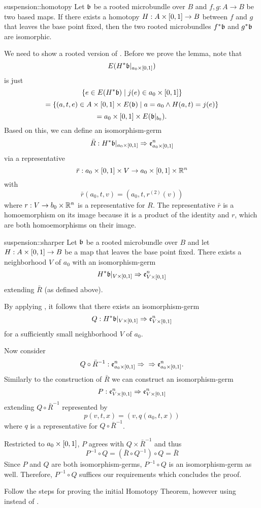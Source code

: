 \begin{mytheorem}{suspension::homotopy}
    Let $\mathfrak{b}$ be a rooted microbundle over $B$ and $f, g: A \to B$ be two based maps.
    If there exists a homotopy $H: A \times [0, 1] \to B$ between $f$ and $g$ that leaves the base point fixed,
    then the two rooted microbundles $f^*\mathfrak{b}$ and $g^*\mathfrak{b}$ are isomorphic.
\end{mytheorem}

\begin{myparagraph}
    We need to show a rooted version of .
    Before we prove the lemma, note that 
    \[ E(H^*\mathfrak{b}\vert_{a_0 \times [0, 1]}) \]
    is just
    \[ \{ e \in E(H^*\mathfrak{b}) \mid j(e) \in a_0 \times [0, 1] \} \]
    \[ = \{ (a, t, e) \in A \times [0, 1] \times E(\mathfrak{b}) \mid a = a_0 \land H(a, t) = j(e) \} \]
    \[ = a_0 \times [0, 1] \times E(\mathfrak{b}\vert_{b_0}). \]
    Based on this, we can define an isomorphism-germ
    \[ \bar{R}: H^*\mathfrak{b}\vert_{a_0 \times [0, 1]} \Rightarrow{}{} \mathfrak{e}^{n}_{a_0 \times [0, 1]} \]
    via a representative
    \[ \bar{r}: a_0 \times [0, 1] \times V \to a_0 \times [0, 1] \times \mathbb{R}^n \]
    with
    \[ \bar{r}(a_0, t, v) = (a_0, t, r^{(2)}(v) )\]
    where $r: V \to b_0 \times \mathbb{R}^n$ is a representative for $R$.
    The representative $\bar{r}$ is a homoemorphism on its image
    because it is a product of the identity and $r$, which are both homoemorphisms on their image. 
\end{myparagraph}

\begin{mylemma}{suspension::sharper}
    Let $\mathfrak{b}$ be a rooted microbundle over $B$ and let $H: A \times [0, 1] \to B$ be a map that leaves the base point fixed.
    There exists a neighborhood $V$ of $a_0$ with an isomorphism-germ
    \[ H^*\mathfrak{b}\vert_{V \times [0, 1]} \Rightarrow{}{} \mathfrak{e}^{n}_{V \times [0, 1]} \]
    extending $\bar{R}$ (as defined above).
\end{mylemma}
\begin{myproof}
    By applying , it follows that there exists an isomorphism-germ
    \[ Q: H^*\mathfrak{b}\vert_{V \times [0, 1]} \Rightarrow{}{} \mathfrak{e}^{n}_{V \times [0, 1]} \]
    for a sufficiently small neighborhood $V$ of $a_0$.

    Now consider
    \[ Q \circ \bar{R}^{-1}: \mathfrak{e}^{n}_{a_0 \times [0, 1]} \Rightarrow{}{} \Rightarrow{} \mathfrak{e}^{n}_{a_0 \times [0, 1]}. \]
    Similarly to the construction of $\bar{R}$ we can construct an isomorphism-germ
    \[ P: \mathfrak{e}^{n}_{V \times [0, 1]} \Rightarrow{}{} \mathfrak{e}^{n}_{V \times [0, 1]} \]
    extending $Q \circ \bar{R}^{-1}$ represented by
    \[ p(v, t, x) = (v, q(a_0, t, x)) \]
    where $q$ is a representative for $Q \circ \bar{R}^{-1}$.

    Restricted to $a_0 \times [0, 1]$, $P$ agrees with $Q \times \bar{R}^{-1}$ and thus
    \[ P^{-1} \circ Q = (\bar{R} \circ Q^{-1}) \circ Q = \bar{R} \]
    Since $P$ and $Q$ are both isomorphism-germs, $P^{-1} \circ Q$ is an isomorphism-germ as well.
    Therefore, $P^{-1} \circ Q$ suffices our requirements which concludes the proof.
\end{myproof}

\begin{myproof}
    Follow the steps for proving the initial Homotopy Theorem,
    however using  instead of .
\end{myproof}